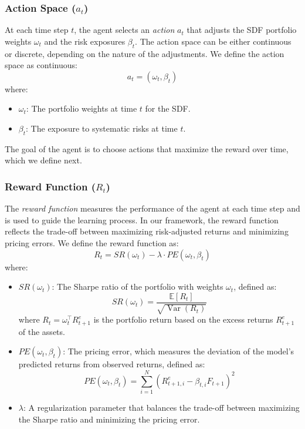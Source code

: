 \subsubsection{Action Space ($a_t$)}

At each time step $t$, the agent selects an \textit{action} $a_t$ that adjusts the SDF portfolio weights $\omega_t$ and the risk exposures $\beta_t$. The action space can be either continuous or discrete, depending on the nature of the adjustments. We define the action space as continuous:
\[
a_t = \left(\omega_t, \beta_t\right)
\]
where:
\begin{itemize}
    \item $\omega_t$: The portfolio weights at time $t$ for the SDF.
    \item $\beta_t$: The exposure to systematic risks at time $t$.
\end{itemize}

The goal of the agent is to choose actions that maximize the reward over time, which we define next.

\subsubsection{Reward Function ($R_t$)}

The \textit{reward function} measures the performance of the agent at each time step and is used to guide the learning process. In our framework, the reward function reflects the trade-off between maximizing risk-adjusted returns and minimizing pricing errors. We define the reward function as:
\[
R_t = SR(\omega_t) - \lambda \cdot PE(\omega_t, \beta_t)
\]
where:
\begin{itemize}
    \item $SR(\omega_t)$: The Sharpe ratio of the portfolio with weights $\omega_t$, defined as:
    \[
    SR(\omega_t) = \frac{\mathbb{E}[R_t]}{\sqrt{\operatorname{Var}(R_t)}}
    \]
    where $R_t = \omega_t^\top R_{t+1}^e$ is the portfolio return based on the excess returns $R_{t+1}^e$ of the assets.
    \item $PE(\omega_t, \beta_t)$: The pricing error, which measures the deviation of the model's predicted returns from observed returns, defined as:
    \[
    PE(\omega_t, \beta_t) = \sum_{i=1}^N \left( R_{t+1, i}^e - \beta_{t, i} F_{t+1} \right)^2
    \]
    \item $\lambda$: A regularization parameter that balances the trade-off between maximizing the Sharpe ratio and minimizing the pricing error.
\end{itemize}

